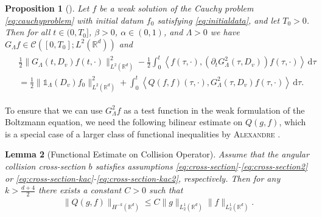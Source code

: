 \documentclass[11pt,a4paper,reqno]{amsart}
\theoremstyle{plain}
\newtheorem{proposition}{Proposition}[section]
\newtheorem{lemma}[proposition]{Lemma}
\theoremstyle{definition}
\begin{document}
\begin{proposition}[]\label{prop:L2reformA}
	Let $f$ be a weak solution of the Cauchy problem \eqref{eq:cauchyproblem} with initial datum $f_0$ satisfying \eqref{eq:initialdata}, and let $T_0>0$. Then for all $t\in(0, T_0]$, $\beta>0$, $\alpha\in(0,1)$, and $\Lambda>0$ we have
$G_{\Lambda}f \in \mathcal{C}\left([0, T_0]; L^2({\mathbb{R}}^d)\right)$ and
	\begin{align}\label{eq:reformulationappendix}
	\begin{split}
	&\frac{1}{2} \|G_{\Lambda}(t,D_v)f(t,\cdot)\|_{L^2({\mathbb{R}}^d)}^2 - \frac{1}{2} \int_0^t \left\langle f(\tau, \cdot), \left( \partial_t G_{\Lambda}^2(\tau, D_v) \right) f(\tau,\cdot)\right\rangle \,\mathrm{d}\tau \\
	&= \frac{1}{2} \|{\mathds{1}}_{\Lambda}(D_v)f_0\|_{L^2({\mathbb{R}}^d)}^2 + \int_0^t \left\langle Q(f,f)(\tau, \cdot), G_{\Lambda}^2(\tau, D_v)f(\tau, \cdot)\right\rangle \, \mathrm{d}\tau.
	\end{split}
	\end{align}
\end{proposition}

To ensure that we can use $G_{\Lambda}^2f$ as a test function in the weak formulation of the Boltzmann equation, we need the following bilinear estimate on $Q(g,f)$, which is a special case of a larger class of functional inequalities by \textsc{Alexandre} \cite{Ale06,Ale09,AH08}.

\begin{lemma}[Functional Estimate on Collision Operator] \label{lem:functional}
	Assume that the angular collision cross-section $b$ satisfies assumptions \eqref{eq:cross-section}-\eqref{eq:cross-section2} or \eqref{eq:cross-section-kac}-\eqref{eq:cross-section-kac2}, respectively. Then for any $k>\frac{d+4}{2}$ there exists a constant $C>0$ such that
	\begin{align}\label{eq:functionalestimate}
		\| Q(g,f)\|_{H^{-k}({\mathbb{R}}^d)} \leq C \|g\|_{L^1_{2}({\mathbb{R}}^d)} \|f\|_{L^1_{2}({\mathbb{R}}^d)}.
	\end{align}
\end{lemma}
\end{document}
